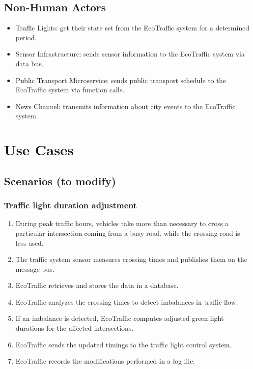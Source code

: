 \documentclass[12pt, a4paper, twoside, openright]{report}
\begin{document}
\subsection{Non-Human Actors}
\begin{itemize}
  \item Traffic Lights: get their state set from the EcoTraffic system for a determined period.
  \item Sensor Infrastructure: sends sensor information to the EcoTraffic system via data bus.
  \item Public Transport Microservice: sends public transport schedule to the EcoTraffic system via function calls.
  \item News Channel: transmits information about city events to the EcoTraffic system.
\end{itemize}

\section{Use Cases}\label{sec:use-cases}
\subsection{Scenarios (to modify)}\label{subsec:scenarios}

\subsubsection{Traffic light duration adjustment}\label{subsubsec:traffic-light-duration}

\begin{enumerate}
\item
  During peak traffic hours, vehicles take more than necessary to cross a
  particular intersection coming from a busy road, while the crossing
  road is less used.
\item
  The traffic system sensor measures crossing times and publishes them on the
  message bus.
\item
  EcoTraffic retrieves and stores the data in a database.
\item
  EcoTraffic analyzes the crossing times to detect imbalances in traffic flow.
\item
  If an imbalance is detected, EcoTraffic computes adjusted green light durations for the affected intersections.
\item
  EcoTraffic sends the updated timings to the traffic light control system.
\item
  EcoTraffic records the modifications performed in a log file.
\end{enumerate}
\end{document}

